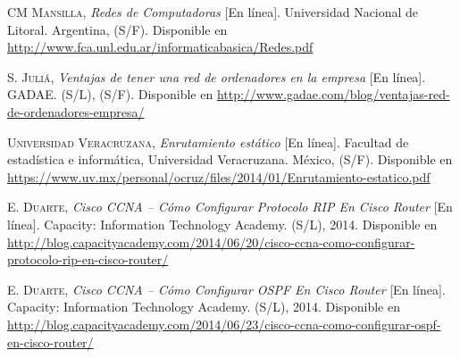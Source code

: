 
\begin{thebibliography}{X}

		\textsc{CM Mansilla,}
		\textit{Redes de Computadoras} [En línea].
		Universidad Nacional de Litoral. Argentina, (S/F). 
		\newline
		Disponible en 
		\url{http://www.fca.unl.edu.ar/informaticabasica/Redes.pdf}

		\textsc{S. Juliá,}
		\textit{Ventajas de tener una red de ordenadores en la empresa} [En línea].
		GADAE. (S/L), (S/F). 
		\newline
		Disponible en 
		\url{http://www.gadae.com/blog/ventajas-red-de-ordenadores-empresa/}

		\textsc{Universidad Veracruzana,}
		\textit{Enrutamiento estático} [En línea].
		Facultad de estadística e informática, Universidad Veracruzana. México, (S/F). 
		\newline
		Disponible en 
		\url{https://www.uv.mx/personal/ocruz/files/2014/01/Enrutamiento-estatico.pdf}

		\textsc{E. Duarte,}
		\textit{Cisco CCNA – Cómo Configurar Protocolo RIP En Cisco Router} [En línea].
		Capacity: Information Technology Academy. (S/L), 2014. 
		\newline
		Disponible en 
		\url{http://blog.capacityacademy.com/2014/06/20/cisco-ccna-como-configurar-protocolo-rip-en-cisco-router/}
		
		\textsc{E. Duarte,}
		\textit{Cisco CCNA – Cómo Configurar OSPF En Cisco Router} [En línea].
		Capacity: Information Technology Academy. (S/L), 2014. 
		\newline
		Disponible en 
		\url{http://blog.capacityacademy.com/2014/06/23/cisco-ccna-como-configurar-ospf-en-cisco-router/}
\end{thebibliography}

